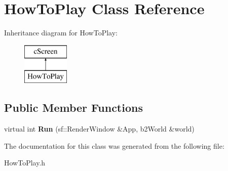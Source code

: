 \hypertarget{class_how_to_play}{}\section{How\+To\+Play Class Reference}
\label{class_how_to_play}
Inheritance diagram for How\+To\+Play\+:\begin{figure}[H]
\begin{center}
\leavevmode
\includegraphics[height=2.000000cm]{class_how_to_play}
\end{center}
\end{figure}
\subsection*{Public Member Functions}
\begin{DoxyCompactItemize}
\item 
virtual int {\bfseries Run} (sf\+::\+Render\+Window \&App, b2\+World \&world)\hypertarget{class_how_to_play_a9b75f61fda038cd3e216701d93be560b}{}\label{class_how_to_play_a9b75f61fda038cd3e216701d93be560b}

\end{DoxyCompactItemize}


The documentation for this class was generated from the following file\+:\begin{DoxyCompactItemize}
\item 
How\+To\+Play.\+h\end{DoxyCompactItemize}
